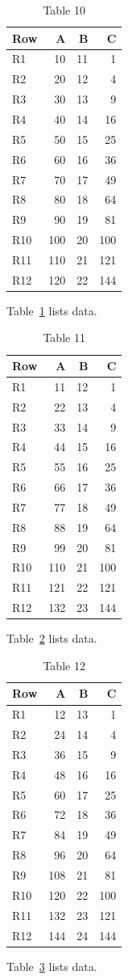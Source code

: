 \documentclass[10pt]{article}
\begin{document}
\begin{table}[ht]\centering\caption{Table 10}\label{tab:10}\begin{tabular}{lrrr}\toprule Row&A&B&C\\\midrule
R1&10&11&1\\
R2&20&12&4\\
R3&30&13&9\\
R4&40&14&16\\
R5&50&15&25\\
R6&60&16&36\\
R7&70&17&49\\
R8&80&18&64\\
R9&90&19&81\\
R10&100&20&100\\
R11&110&21&121\\
R12&120&22&144\\
\bottomrule\end{tabular}\end{table} Table~\ref{tab:10} lists data.
\begin{table}[ht]\centering\caption{Table 11}\label{tab:11}\begin{tabular}{lrrr}\toprule Row&A&B&C\\\midrule
R1&11&12&1\\
R2&22&13&4\\
R3&33&14&9\\
R4&44&15&16\\
R5&55&16&25\\
R6&66&17&36\\
R7&77&18&49\\
R8&88&19&64\\
R9&99&20&81\\
R10&110&21&100\\
R11&121&22&121\\
R12&132&23&144\\
\bottomrule\end{tabular}\end{table} Table~\ref{tab:11} lists data.
\begin{table}[ht]\centering\caption{Table 12}\label{tab:12}\begin{tabular}{lrrr}\toprule Row&A&B&C\\\midrule
R1&12&13&1\\
R2&24&14&4\\
R3&36&15&9\\
R4&48&16&16\\
R5&60&17&25\\
R6&72&18&36\\
R7&84&19&49\\
R8&96&20&64\\
R9&108&21&81\\
R10&120&22&100\\
R11&132&23&121\\
R12&144&24&144\\
\bottomrule\end{tabular}\end{table}\clearpage Table~\ref{tab:12} lists data.
\end{document}
